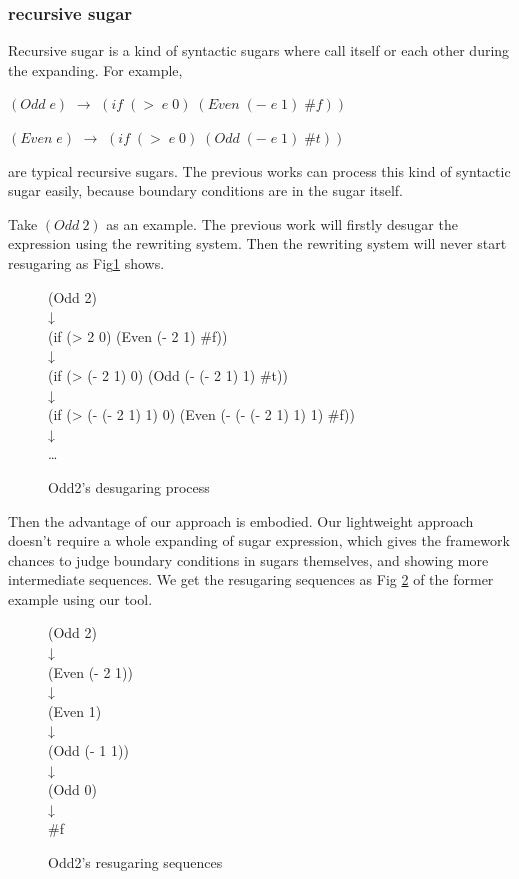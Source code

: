 \subsubsection{recursive sugar}
Recursive sugar is a kind of syntactic sugars where call itself or each other during the expanding. For example,

$(Odd\;e)$ $\rightarrow$ $(if\;(>\;e\;0)\;(Even\;(-\;e\;1)\;\#f))$

$(Even\;e)$ $\rightarrow$ $(if\;(>\;e\;0)\;(Odd\;(-\;e\;1)\;\#t))$

are typical recursive sugars. The previous works can process this kind of syntactic sugar easily, because boundary conditions are in the sugar itself.

Take $(Odd~2)$ as an example. The previous work will firstly desugar the expression using the rewriting system. Then the rewriting system will never start resugaring as Fig\ref{fig:odd} shows.

\begin{figure}[ht]
	\centering
	\parbox[t]{\textwidth}{
				\begin{center}
				{
					\small\selectfont
					(Odd 2)\\
					↓\\
					(if (> 2 0) (Even (- 2 1) \#f))\\
					↓\\
					(if (> (- 2 1) 0) (Odd (- (- 2 1) 1) \#t))\\
					↓\\
					(if (> (- (- 2 1) 1) 0) (Even (- (- (- 2 1) 1) 1) \#f))\\
					↓\\
					{\ldots}
				}
				\end{center}
				
			}
	\caption{Odd2's desugaring process}
\label{fig:odd}
\end{figure}

Then the advantage of our approach is embodied. Our lightweight approach doesn't require a whole expanding of sugar expression, which gives the framework chances to judge boundary conditions in sugars themselves, and showing more intermediate sequences. We get the resugaring sequences as Fig \ref{fig:rec} of the former example using our tool.

\begin{figure}[ht]
	\centering
	\parbox[t]{\textwidth}{
				\begin{center}
				{
					\small\selectfont
					(Odd 2)\\
					↓\\
					(Even (- 2 1))\\
					↓\\
					(Even 1)\\
					↓\\
					(Odd (- 1 1))\\
					↓\\
					(Odd 0)\\
					↓\\
					\#f
				}
				\end{center}
				
			}
	\caption{Odd2's resugaring sequences}
\label{fig:rec}
\end{figure}


